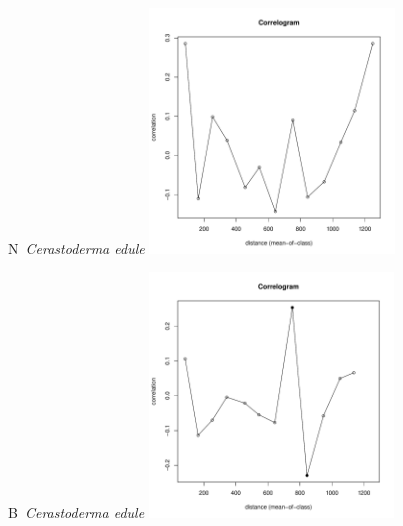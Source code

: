 \documentclass[12pt, a4paper]{disser}
\begin{document}
\begin{figure}[h]
	
	\begin{minipage}[b]{.46\linewidth}
	\begin{center}
	{\small N~{\it Cerastoderma edule}}
		\includegraphics[width=65mm]{../Barenc_Sea/distribution_Moran/Plyazh07_moran_N_Cerastoderma_edule_.pdf}

	\end{center}
	\end{minipage}
	\hfil %
	\begin{minipage}[b]{.46\linewidth}
	\begin{center}
	{\small B~{\it Cerastoderma edule}}
		\includegraphics[width=65mm]{../Barenc_Sea/distribution_Moran/Plyazh07_moran_B_Cerastoderma_edule_.pdf}
	\end{center}
	\end{minipage}






\end{figure}
\end{document}
